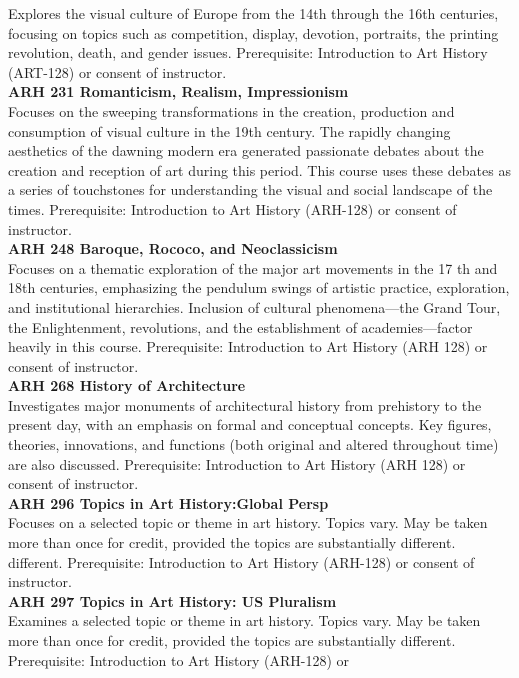 \documentclass[
  letterpaper,
]{scrbook}
\begin{document}
Explores the visual culture of Europe from the 14th through the 16th
centuries, focusing on topics such as competition, display, devotion,
portraits, the printing revolution, death, and gender issues.
Prerequisite: Introduction to Art History (ART-128) or consent of
instructor.\\
\textbf{ARH 231 Romanticism, Realism, Impressionism}\\
Focuses on the sweeping transformations in the creation, production and
consumption of visual culture in the 19th century. The rapidly changing
aesthetics of the dawning modern era generated passionate debates about
the creation and reception of art during this period. This course uses
these debates as a series of touchstones for understanding the visual
and social landscape of the times. Prerequisite: Introduction to Art
History (ARH-128) or consent of instructor.\\
\textbf{ARH 248 Baroque, Rococo, and Neoclassicism}\\
Focuses on a thematic exploration of the major art movements in the 17
th and 18th centuries, emphasizing the pendulum swings of artistic
practice, exploration, and institutional hierarchies. Inclusion of
cultural phenomena---the Grand Tour, the Enlightenment, revolutions, and
the establishment of academies---factor heavily in this course.
Prerequisite: Introduction to Art History (ARH 128) or consent of
instructor.\\
\textbf{ARH 268 History of Architecture}\\
Investigates major monuments of architectural history from prehistory to
the present day, with an emphasis on formal and conceptual concepts. Key
figures, theories, innovations, and functions (both original and altered
throughout time) are also discussed. Prerequisite: Introduction to Art
History (ARH 128) or consent of instructor.\\
\textbf{ARH 296 Topics in Art History:Global Persp}\\
Focuses on a selected topic or theme in art history. Topics vary. May be
taken more than once for credit, provided the topics are substantially
different. different. Prerequisite: Introduction to Art History
(ARH-128) or consent of instructor.\\
\textbf{ARH 297 Topics in Art History: US Pluralism}\\
Examines a selected topic or theme in art history. Topics vary. May be
taken more than once for credit, provided the topics are substantially
different. Prerequisite: Introduction to Art History (ARH-128) or
\end{document}
